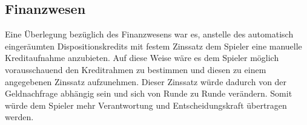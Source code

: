 \subsection{Finanzwesen}
\label{sec:fazit-spielverlauf-finanzwesen}

Eine Überlegung bezüglich des Finanzwesens war es, anstelle des automatisch eingeräumten Dispositionskredits mit festem Zinssatz dem Spieler eine manuelle Kreditaufnahme anzubieten. Auf diese Weise wäre es dem Spieler möglich vorausschauend den Kreditrahmen zu bestimmen und diesen zu einem angegebenen Zinssatz aufzunehmen. Dieser Zinssatz würde dadurch von der Geldnachfrage abhängig sein und sich von Runde zu Runde verändern. Somit würde dem Spieler mehr Verantwortung und Entscheidungskraft übertragen werden. 